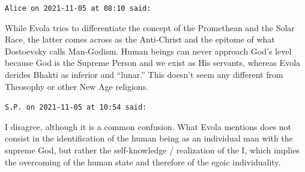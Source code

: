 \begin{footnotesize}
\begin{sffamily}
\hfill

\texttt{Alice on 2021-11-05 at 08:10 said:}

While Evola tries to differentiate the concept of the Promethean and the Solar Race, the latter comes across as the Anti-Christ and the epitome of what Dostoevsky calls Man-Godism. Human beings can never approach God's level because God is the Supreme Person and we exist as His servants, whereas Evola derides Bhakti as inferior and ``lunar.'' This doesn't seem any different from Theosophy or other New Age religions.

\hfill

\texttt{S.P. on 2021-11-05 at 10:54 said:}

I disagree, although it is a common confusion. What Evola mentions does not consist in the identification of the human being as an individual man with the supreme God, but rather the self-knowledge / realization of the I, which implies the overcoming of the human state and therefore of the egoic individuality.

\hfill

\end{sffamily}
\end{footnotesize}


